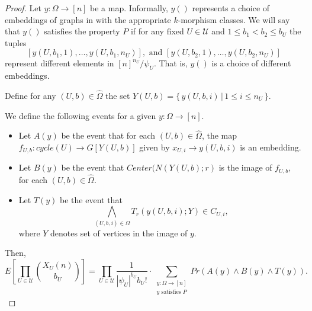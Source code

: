 \documentclass[11pt,notitlepage]{report}
\theoremstyle{definition}
\theoremstyle{remark}
\begin{document}
\begin{proof}
	Let $y: \Omega \rightarrow [n]$ be a map. Informally, $y()$
	represents a choice of embeddings of graphs in with the appropriate
	$k$-morphism classes. We will say that $y()$ satisfies the property
	$P$ if for any fixed $U\in \mathcal{U}$ and $1\leq b_1<b_2\leq b_{U}$
	the tuples
	\[ [y(U,b_1,1), \dots, y(U,b_1,n_U)], \text{ and }
	[y(U,b_2,1), \dots, y(U,b_2,n_U)] \]
	represent different elements in $[n]^{n_U}/\psi_U$. That is, $y()$ is 
	a choice of different embeddings.\par
	Define for any $(U,b)\in \widehat{\Omega}$
	the set $Y(U,b)=\{ \, y(U,b,i) \, | \, 1\leq i \leq n_U \, \}$.
	
	We define the following events for a given $y:\Omega\rightarrow [n]$.
	\begin{itemize}
		\item Let $A(y)$ be the event that for each $(U,b)\in \widehat{\Omega}$,
		the map $f_{U,b}:cycle(U)\rightarrow G[Y(U,b)]$ given
		by $x_{U,i} \rightarrow y(U,b,i)$ is an embedding. 	
		\item Let $B(y)$ be the event that $Center(N(Y(U,b);r)$ is 
		the image of $f_{U,b}$,	for each $(U,b)\in \widehat{\Omega}$.
		\item Let $T(y)$ be the event that 
		\[\bigwedge_{(U,b,i)\in \Omega} T_r(y(U,b,i); Y)\in C_{U,i}, \]
		where $Y$ denotes set of vertices in the image of $y$.  
	\end{itemize}
	Then,
	\[ E\left[\prod_{U\in \mathcal{U}}
	\binom{X_{U}(n)}{b_{U}}\right] = \prod_{U\in \mathcal{U}} 
	\frac{1}{|\psi_U|^{b_U}b_U!} \cdot
	\sum_{\substack{y:\Omega \rightarrow [n]\\y \text{ satisfies }P}}
	Pr(A(y)\wedge B(y)\wedge T(y)). \]
	

\end{proof}
\end{document}
